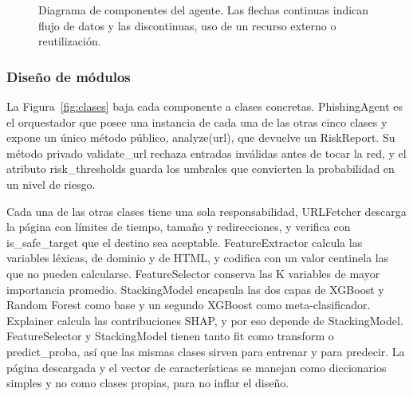 \begin{figure}[ht]
{}
\caption{Diagrama de componentes del agente. Las flechas continuas indican flujo de datos y las discontinuas, uso de un recurso externo o reutilización.}
\label{fig:componentes}
\end{figure}

\subsubsection{Diseño de módulos}

La Figura~\ref{fig:clases} baja cada componente a clases concretas. PhishingAgent es el orquestador que posee una instancia de cada una de las otras cinco clases y expone un único método público, analyze(url), que devuelve un RiskReport. Su método privado validate\_url rechaza entradas inválidas antes de tocar la red, y el atributo risk\_thresholds guarda los umbrales que convierten la probabilidad en un nivel de riesgo. \newline

Cada una de las otras clases tiene una sola responsabilidad, URLFetcher descarga la página con límites de tiempo, tamaño y redirecciones, y verifica con is\_safe\_target que el destino sea aceptable. FeatureExtractor calcula las variables léxicas, de dominio y de HTML, y codifica con un valor centinela las que no pueden calcularse. FeatureSelector conserva las K variables de mayor importancia promedio. StackingModel encapsula las dos capas de XGBoost y Random Forest como base y un segundo XGBoost como meta-clasificador. Explainer calcula las contribuciones SHAP, y por eso depende de StackingModel. FeatureSelector y StackingModel tienen tanto fit como transform o predict\_proba, así que las mismas clases sirven para entrenar y para predecir. La página descargada y el vector de características se manejan como diccionarios simples y no como clases propias, para no inflar el diseño.
\newline


